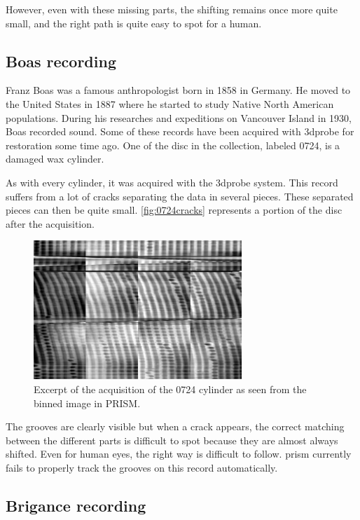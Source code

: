 However, even with these missing parts, the shifting remains once more quite small, and the right path is quite easy to spot for a human.

\subsection{Boas recording}

Franz Boas was a famous anthropologist born in 1858 in Germany. He moved to the United States in 1887 where he started to study Native North American populations. During his researches and expeditions on Vancouver Island in 1930, Boas recorded sound. Some of these records have been acquired with \gls{3dprobe} for restoration some time ago. One of the disc in the collection, labeled 0724, is a damaged wax cylinder.

As with every cylinder, it was acquired with the \gls{3dprobe} system. This record suffers from a lot of cracks separating the data in several pieces. These separated pieces can then be quite small. \autoref{fig:0724cracks} represents a portion of the disc after the acquisition.

\begin{figure}[!ht]
\centering
\includegraphics[width=0.7\textwidth]{images/0724-cracks}
\caption[Excerpt of the acquisition of the 0724 cylinder.]
{Excerpt of the acquisition of the 0724 cylinder as seen from the binned image in PRISM.}
\label{fig:0724cracks}
\end{figure}

The grooves are clearly visible but when a crack appears, the correct matching between the different parts is difficult to spot because they are almost always shifted. Even for human eyes, the right way is difficult to follow. \gls{prism} currently fails to properly track the grooves on this record automatically.

\subsection{Brigance recording}

